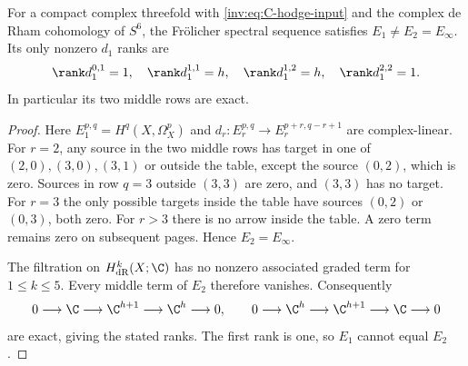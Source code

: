 \begin{proposition}\label{inv:C1.1}
For a compact complex threefold with \eqref{inv:eq:C-hodge-input} and the
complex de Rham cohomology of $S^6$, the Fr\"olicher spectral sequence
satisfies $E_1\ne E_2=E_\infty$.  Its only nonzero $d_1$ ranks are
\[
\rank d_1^{0,1}=1,\quad \rank d_1^{1,1}=h,\quad
\rank d_1^{1,2}=h,\quad \rank d_1^{2,2}=1.
\]
In particular its two middle rows are exact.
\end{proposition}
\begin{proof}
Here $E_1^{p,q}=H^q(X,\Omega_X^p)$ and
$d_r:E_r^{p,q}\longrightarrow E_r^{p+r,q-r+1}$ are complex-linear.
For $r=2$, any source in the two middle rows has target in one of
$(2,0),(3,0),(3,1)$ or outside the table, except the source $(0,2)$,
which is zero.  Sources in row $q=3$ outside $(3,3)$ are zero, and
$(3,3)$ has no target.  For $r=3$ the only possible targets inside the
table have sources $(0,2)$ or $(0,3)$, both zero.  For $r>3$ there is
no arrow inside the table.  A zero term remains zero on subsequent
pages.  Hence $E_2=E_\infty$.

The filtration on $H^k_{\mathrm{dR}}(X;\C)$ has no nonzero associated
graded term for $1\le k\le5$.  Every middle term of $E_2$ therefore
vanishes.  Consequently
\[
0\longrightarrow\C\longrightarrow\C^{h+1}
\longrightarrow\C^h\longrightarrow0,
\qquad
0\longrightarrow\C^h\longrightarrow\C^{h+1}
\longrightarrow\C\longrightarrow0
\]
are exact, giving the stated ranks.  The first rank is one, so $E_1$
cannot equal $E_2$.
\end{proof}

